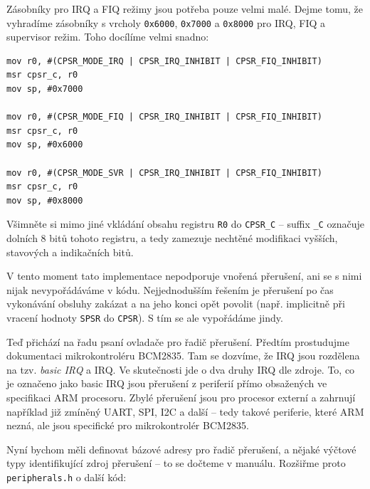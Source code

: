 \documentclass{article}
\begin{document}
Zásobníky pro IRQ a FIQ režimy jsou potřeba pouze velmi malé. Dejme tomu, že vyhradíme zásobníky s vrcholy \texttt{0x6000}, \texttt{0x7000} a \texttt{0x8000} pro IRQ, FIQ a supervisor režim. Toho docílíme velmi snadno:
\begin{lstlisting}
mov r0, #(CPSR_MODE_IRQ | CPSR_IRQ_INHIBIT | CPSR_FIQ_INHIBIT)
msr cpsr_c, r0
mov sp, #0x7000

mov r0, #(CPSR_MODE_FIQ | CPSR_IRQ_INHIBIT | CPSR_FIQ_INHIBIT)
msr cpsr_c, r0
mov sp, #0x6000

mov r0, #(CPSR_MODE_SVR | CPSR_IRQ_INHIBIT | CPSR_FIQ_INHIBIT)
msr cpsr_c, r0
mov sp, #0x8000
\end{lstlisting}

Všimněte si mimo jiné vkládání obsahu registru \texttt{R0} do \texttt{CPSR\_C} -- suffix \texttt{\_C} označuje dolních 8 bitů tohoto registru, a tedy zamezuje nechtěné modifikaci vyšších, stavových a indikačních bitů.

V tento moment tato implementace nepodporuje vnořená přerušení, ani se s nimi nijak nevypořádáváme v kódu. Nejjednodušším řešením je přerušení po čas vykonávání obsluhy zakázat a na jeho konci opět povolit (např. implicitně při vracení hodnoty \texttt{SPSR} do \texttt{CPSR}). S tím se ale vypořádáme jindy.

Teď přichází na řadu psaní ovladače pro řadič přerušení. Předtím prostudujme dokumentaci mikrokontroléru BCM2835. Tam se dozvíme, že IRQ jsou rozdělena na tzv. \emph{basic IRQ} a  IRQ. Ve skutečnosti jde o dva druhy IRQ dle zdroje. To, co je označeno jako basic IRQ jsou přerušení z periferií přímo obsažených ve specifikaci ARM procesoru. Zbylé přerušení jsou pro procesor externí a zahrnují například již zmíněný UART, SPI, I2C a další -- tedy takové periferie, které ARM nezná, ale jsou specifické pro mikrokontrolér BCM2835.

Nyní bychom měli definovat bázové adresy pro řadič přerušení, a nějaké výčtové typy identifikující zdroj přerušení -- to se dočteme v manuálu. Rozšiřme proto \texttt{peripherals.h} o další kód:
\end{document}
